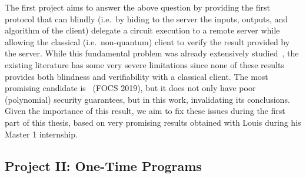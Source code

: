 The first project aims to answer the above question by providing the first protocol that can blindly (i.e.\ by hiding to the server the inputs, outputs, and algorithm of the client) delegate a circuit execution to a remote server while allowing the classical (i.e.\ non-quantum) client to verify the result provided by the server. While this fundamental problem was already extensively studied~\cite{CCKW19_QFactoryClassicallyInstructedRemote,mahadev_classical_2018}, the existing literature has some very severe limitations since none of these results provides both blindness and verifiability with a classical client. The most promising candidate is~\cite{GV19_ComputationallySecureComposableRemote} (FOCS 2019), but it does not only have poor (polynomial) security guarantees, but  in this work, invalidating its conclusions. Given the importance of this result, we aim to fix these issues during the first part of this thesis, based on very promising results obtained with Louis during his Master 1 internship.



\subsection{Project II: One-Time Programs}

